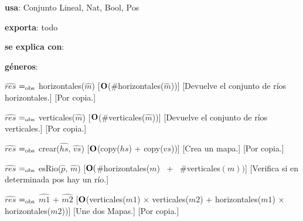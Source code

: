 \begin{Interfaz}
  
    \textbf{usa}: Conjunto Lineal, Nat, Bool, Pos

    \textbf{exporta}: todo 

    \textbf{se explica con}: 
  
    \textbf{géneros}: 
  
  
    {$\hat{res}$ $=_{\mathrm{obs}}$ horizontales($\hat{m}$)}%
    [$\bold{O}$(\#horizontales($\hat{m}$))] 
    [Devuelve el conjunto de ríos horizontales.]
    [Por copia.]

    {$\hat{res}$ $=_{\mathrm{obs}}$ verticales($\hat{m}$)}%
    [$\bold{O}$(\#verticales($\hat{m}$))] 
    [Devuelve el conjunto de ríos verticales.]
    [Por copia.]

    {$\hat{res}$ $=_{\mathrm{obs}}$ crear($\hat{hs}$, $\hat{vs}$)}%
    [$\bold{O}$(copy($hs$) + copy($vs$))] 
    [Crea un mapa.]
    [Por copia.]

    {$\hat{res}$ $=_{\mathrm{obs}}$ esRio($\hat{p}$, $\hat{m}$)}%
    [$\bold{O}($\#horizontales($m$) \ + \  \#verticales$(m))$]
    [Verifica si en determinada pos hay un río.] 

    {$\hat{res}$ $=_{\mathrm{obs}}$ $\hat{m1}$ + $\hat{m2}$}%
    [$\bold{O}$(verticales($m1$) $\times$ verticales($m2$) + horizontales($m1$) $\times$ horizontales($m2$))]
    [Une dos Mapas.] 
    [Por copia.]

  \end{Interfaz}